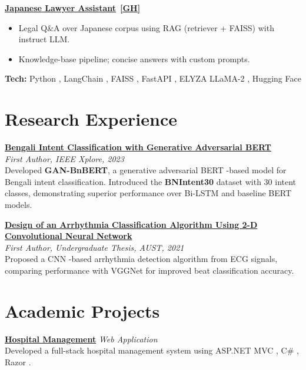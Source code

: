 \documentclass[10pt,letterpaper]{article}
\newcommand{\pill}[1]{%
  \begingroup\setlength{\fboxsep}{1.2pt}%
  \colorbox{brandblue!12}{\textcolor{brandblue}{\scriptsize #1}}%
  \endgroup
}
\newenvironment{project}{%
  \begin{tcolorbox}[
    enhanced,breakable,
    colback=white,colframe=white,
    borderline west={0.8pt}{0pt}{rail}, %
    left=10pt,right=0pt,top=2pt,bottom=2pt,
    boxsep=0pt,arc=0pt,outer arc=0pt,
    before skip=10pt,after skip=10pt
  ]%
  \setlength{\parskip}{6pt}\setlength{\parindent}{0pt}%
}{\end{tcolorbox}}
\newcommand{\ghicon}{\ifdefined\faGithub \faGithub \else \textbf{[GH]} \fi}
\newenvironment{projlist}{\begin{itemize}[leftmargin=*,nosep,topsep=0pt]\setlength{\itemsep}{1pt}}{\end{itemize}}
\newcommand{\ProjectHeading}[2]{\textbf{\href{#2}{#1}}\ \href{#2}{\ghicon}}
\begin{document}
\begin{project}
  \ProjectHeading{Japanese Lawyer Assistant}{http://v1nay.is-a.dev/}
  \begin{projlist}
    \item Legal Q\&A over Japanese corpus using RAG (retriever + FAISS) with instruct LLM.
    \item Knowledge-base pipeline; concise answers with custom prompts.
  \end{projlist}
  {\footnotesize \textbf{Tech:} \pill{Python}, \pill{LangChain}, \pill{FAISS}, \pill{FastAPI}, \pill{ELYZA LLaMA-2}, \pill{Hugging Face}}
\end{project}


\section{Research Experience}

\textbf{\href{https://ieeexplore.ieee.org/document/10440989}{Bengali Intent Classification with Generative Adversarial BERT}} \\
\textit{First Author, IEEE Xplore, 2023} \\
Developed \textbf{GAN-BnBERT}, a generative adversarial \pill{BERT}-based model for Bengali intent classification. Introduced the \textbf{BNIntent30} dataset with 30 intent classes, demonstrating superior performance over \pill{Bi-LSTM} and baseline \pill{BERT} models.

\medskip

\textbf{\href{http://v1nay.is-a.dev/}{Design of an Arrhythmia Classification Algorithm Using 2-D Convolutional Neural Network}} \\
\textit{First Author, Undergraduate Thesis, AUST, 2021} \\
Proposed a \pill{CNN}-based arrhythmia detection algorithm from \pill{ECG} signals, comparing performance with \pill{VGGNet} for improved beat classification accuracy.


\section{Academic Projects}

\textbf{\href{http://v1nay.is-a.dev/}{Hospital Management}}  \textbar{} \textit{Web Application} \\
Developed a full-stack hospital management system using \pill{ASP.NET MVC}, \pill{C\#}, \pill{Razor}. \medskip
\end{document}
